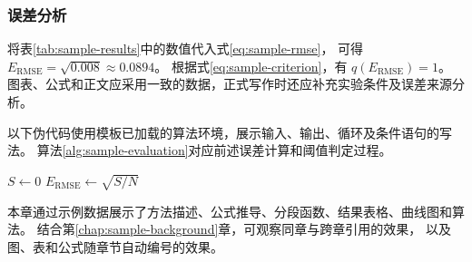 \subsubsection{误差分析}

将表\ref{tab:sample-results}中的数值代入式\eqref{eq:sample-rmse}，
可得 $E_{\mathrm{RMSE}}=\sqrt{0.008}\approx 0.0894$。
根据式\eqref{eq:sample-criterion}，有 $q(E_{\mathrm{RMSE}})=1$。
图表、公式和正文应采用一致的数据，正式写作时还应补充实验条件及误差来源分析。


以下伪代码使用模板已加载的算法环境，展示输入、输出、循环及条件语句的写法。
算法\ref{alg:sample-evaluation}对应前述误差计算和阈值判定过程。

\begin{algorithm}[htbp]
    \caption{示例模型的误差评价流程}
    \label{alg:sample-evaluation}
    $S \leftarrow 0$\;
    $E_{\mathrm{RMSE}} \leftarrow \sqrt{S/N}$\;
\end{algorithm}


本章通过示例数据展示了方法描述、公式推导、分段函数、结果表格、曲线图和算法。
结合第\ref{chap:sample-background}章，可观察同章与跨章引用的效果，
以及图、表和公式随章节自动编号的效果。
